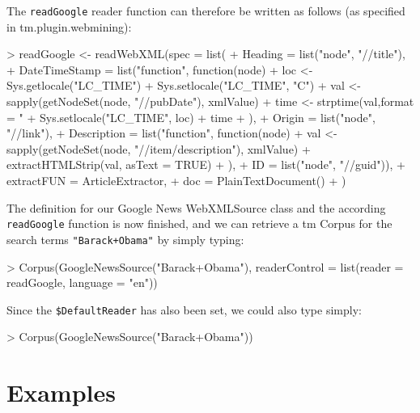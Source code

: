 \documentclass[a4paper]{article}
\let\code=\texttt
\newcommand{\class}[1]{\mbox{\textsf{#1}}}
\newcommand{\pkg}[1]{{\normalfont\fontseries{b}\selectfont #1}}
\newcommand{\fkt}[1]{\code{#1}}
\newcommand{\field}[1]{\code{\$#1}}
\begin{document}
The \fkt{readGoogle} reader function can therefore be written as follows (as specified in \pkg{tm.plugin.webmining}):
\begin{Schunk}
\begin{Sinput}
> readGoogle <- readWebXML(spec = list(
+ 		Heading = list("node", "//title"),
+ 		DateTimeStamp = list("function", function(node){
+ 					loc <- Sys.getlocale("LC_TIME")
+ 					Sys.setlocale("LC_TIME", "C")
+ 					val <- sapply(getNodeSet(node, "//pubDate"), xmlValue)
+ 					time <- strptime(val,format = "%
+ 					Sys.setlocale("LC_TIME", loc)
+ 					time
+ 				}),
+ 		Origin = list("node", "//link"),
+ 		Description = list("function", function(node){
+ 					val <- sapply(getNodeSet(node, "//item/description"), xmlValue)
+ 					extractHTMLStrip(val, asText = TRUE)
+ 				}),
+ 		ID = list("node",  "//guid")),
+ 	extractFUN = ArticleExtractor,
+ 	doc = PlainTextDocument()
+ )
\end{Sinput}
\end{Schunk}
The definition for our Google News \class{WebXMLSource} class and the according \fkt{readGoogle} function
is now finished, and we can retrieve a \pkg{tm} \class{Corpus} for the search terms \code{"Barack+Obama"} by simply
typing:
\begin{Schunk}
\begin{Sinput}
> Corpus(GoogleNewsSource("Barack+Obama"), readerControl = list(reader = readGoogle, language = "en"))
\end{Sinput}
\end{Schunk}
Since the \field{DefaultReader} has also been set, we could also type simply:
\begin{Schunk}
\begin{Sinput}
> Corpus(GoogleNewsSource("Barack+Obama"))
\end{Sinput}
\end{Schunk}


\section{Examples}
\end{document}
